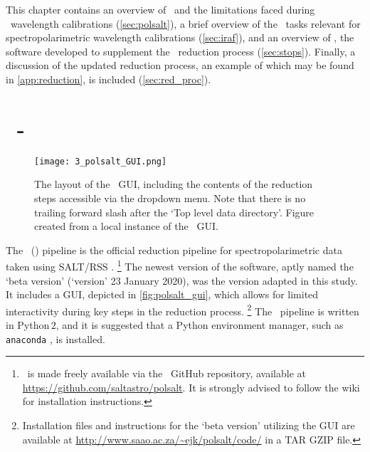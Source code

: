  \label{ch:03} %

This chapter contains an overview of \polsalt\ and the limitations faced during \polsalt\ wavelength calibrations (\autoref{sec:polsalt}), a brief overview of the \iraf\ tasks relevant for spectropolarimetric wavelength calibrations (\autoref{sec:iraf}), and an overview of \stops, the software developed to supplement the \polsalt\ reduction process (\autoref{sec:stops}).
Finally, a discussion of the updated reduction process, an example of which may be found in \autoref{app:reduction}, is included (\autoref{sec:red_proc}).

\section[\textsc{polsalt}]{\polsalt\ - } \label{sec:polsalt}

\begin{figure}[t]
    \centering
    \texttt{[image: 3\_polsalt\_GUI.png]}
    \caption{
        The layout of the \polsalt\ \gls{GUI}, including the contents of the reduction steps accessible via the dropdown menu.
        Note that there is no trailing forward slash after the `Top level data directory'.
        Figure created from a local instance of the \polsalt\ \gls{GUI}.
    }
    \label{fig:polsalt_gui}
\end{figure}

The \polsalt\ () pipeline is the official reduction pipeline for spectropolarimetric data taken using \gls{SALT}/\gls{RSS} \citep{polsalt}.%
\footnote{\polsalt\ is made freely available via the \polsalt\ GitHub repository, available at \url{https://github.com/saltastro/polsalt}.
It is strongly advised to follow the wiki for installation instructions.}
The newest version of the software, aptly named the `beta version' (`version' 23 January 2020), was the version adapted in this study.
It includes a \gls{GUI}, depicted in \autoref{fig:polsalt_gui}, which allows for limited interactivity during key steps in the reduction process.%
\footnote{Installation files and instructions for the `beta version' utilizing the \gls{GUI} are available at \url{http://www.saao.ac.za/~ejk/polsalt/code/} in a TAR GZIP file.}
The \polsalt\ pipeline is written in Python\,$2$, and it is suggested that a Python environment manager, such as \texttt{anaconda} \citep{anaconda}, is installed.

